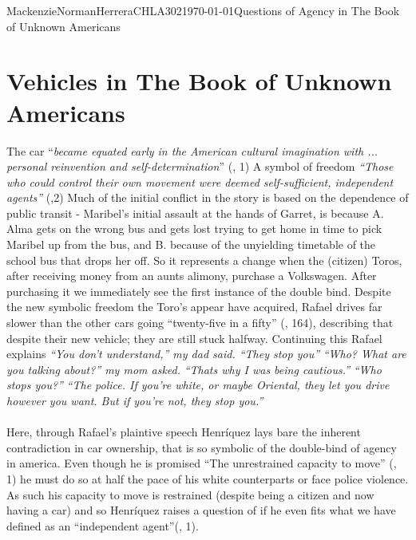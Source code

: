 \documentclass{article}
\begin{document}
\begin{mla}{Mackenzie}{Norman}{Herrera}{CHLA302}{\today}{Questions of Agency in The Book of Unknown Americans}
\section*{Vehicles in The Book of Unknown Americans}
The car ``\textit{became equated early in the American cultural imagination with ... personal reinvention and self-determination}'' (\cite{Uhlman2015-qx}, 1) A symbol of freedom \textit{``Those who could control their own movement were deemed self-sufficient, independent agents''} (\cite{Uhlman2015-qx},2) Much of the initial conflict in the story is based on the dependence of public transit - Maribel's initial assault at the hands of Garret, is because A. Alma gets on the wrong bus and gets lost trying to get home in time to pick Maribel up from the bus, and B. because of the unyielding timetable of the school bus that drops her off. So it represents a change when the (citizen) Toros, after receiving money from an aunts alimony, purchase a Volkswagen. After purchasing it we immediately see the first instance of the double bind. Despite the new symbolic freedom the Toro's appear have acquired, Rafael drives far slower than the other cars going ``twenty-five in a fifty'' (\cite{Henriquez2014-sh}, 164), describing that despite their new vehicle; they are still stuck halfway. Continuing this Rafael explains
\noindent\linebreak
\textit{``You don't understand,'' my dad said. ``They stop you''}
\noindent\linebreak
\textit{``Who? What are you talking about?'' my mom asked.}
\noindent\linebreak
\textit{``Thats why I was being cautious.''}
\noindent\linebreak
\textit{``Who stops you?''}
\noindent\linebreak
\textit{``The police. If you're white, or maybe Oriental, they let you drive however you want. But if you're not, they stop you.''}
\paragraph{}
Here, through Rafael's plaintive speech Henríquez lays bare the inherent contradiction in car ownership, that is so symbolic of the double-bind of agency in america. Even though he is promised ``The unrestrained capacity to move'' (\cite{Uhlman2015-qx}, 1) he must do so at half the pace of his white counterparts or face police violence. As such his capacity to move is restrained (despite being a citizen and now having a car) and so Henríquez raises a question of if he even fits what we have defined as an ``independent agent''(\cite{Uhlman2015-qx}, 1).




\end{mla}
\end{document}

